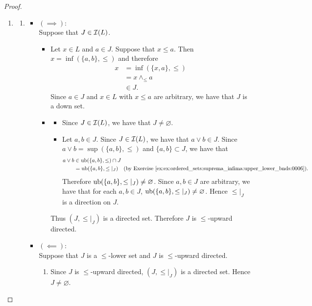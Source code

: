 \documentclass{book}
\begin{document}
	\begin{proof}\
		\begin{enumerate}
			\item 
			\begin{enumerate}
				\item 
				\begin{itemize}
					\item $(\implies)$: \\
					Suppose that $J \in \mathcal{I}(L)$.
					\begin{itemize}
						\item Let $x \in L$ and $a \in J$. Suppose that $x \leq a$. Then $x = \inf(\{a,b\}, \leq)$ and therefore
						\begin{align*}
							x
							& = \inf(\{x, a\}, \leq) \\
							& = x \wedge_{\leq} a \\
							& \in J. 
						\end{align*}  
						Since $a \in J$ and $x \in L$ with $x \leq a$ are arbitrary, we have that $J$ is a down set. 
						\item 
						\begin{itemize}
							\item Since $J \in \mathcal{I}(L)$, we have that $J \neq \varnothing$. 
							\item Let $a, b \in J$. Since $J \in \mathcal{I}(L)$, we have that $a \vee b \in J$. Since $a \vee b = \sup (\{a,b\}, \leq)$ and $\{a,b\} \subset J$, we have that 
							\begin{align*}
								a \vee b
								& \in \ubd(\{a,b\}, \leq) \cap J\\
								& = \ubd(\{a,b\}, \leq|_J) \quad \text{(by \rex{ex:ordered_sets:suprema_infima:upper_lower_bnds:0006})}. \\
							\end{align*}
							Therefore $\operatorname{ub}(\{a,b\}, \leq|_J) \neq \varnothing$. Since $a,b \in J$ are arbitrary, we have that for each $a,b \in J$, $\operatorname{ub}(\{a,b\}, \leq|_J) \neq \varnothing$. Hence $\leq|_J$ is a direction on $J$.
						\end{itemize}
						Thus $(J, \leq|_J)$ is a directed set. Therefore $J$ is $\leq$-upward directed. 
					\end{itemize}
					\item $(\impliedby)$: \\
					Suppose that $J$ is a $\leq$-lower set and $J$ is $\leq$-upward directed. 
					\begin{enumerate}
						\item Since $J$ is $\leq$-upward directed, $(J, \leq|_J)$ is a directed set. Hence $J \neq \varnothing$.

\end{enumerate}
\end{itemize}
\end{enumerate}
\end{enumerate}
\end{proof}
\end{document}
